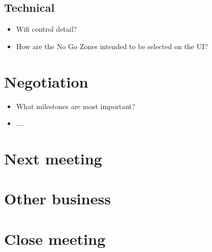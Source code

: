\documentclass[11pt, a4paper]{article}
\begin{document}
\subsection{Technical}
\begin{itemize}
\item Wifi control detail?
\item How are the No Go Zones intended to be selected on the UI?
\end{itemize}

\section{Negotiation}
\begin{itemize}
	\item What milestones are most important?
	\item ....
\end{itemize}

\section{Next meeting}

\section{Other business}

\section {Close meeting}
\vspace*{10pt}
\end{document}
